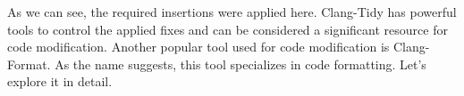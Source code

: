 As we can see, the required insertions were applied here. Clang-Tidy has powerful tools to control the applied fixes and can be considered a significant resource for code modification. Another popular tool used for code modification is Clang-Format. As the name suggests, this tool specializes in code formatting. Let’s explore it in detail.




























































































